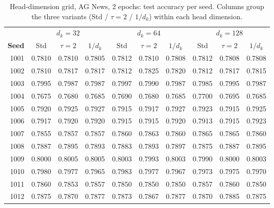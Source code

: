 \documentclass[10pt,a4paper]{article}
\newcommand{\dk}{d_k}
\begin{document}
\begin{table}[H]
  \centering
  \caption{Head-dimension grid, AG News, 2 epochs: test accuracy per seed.
  Columns group the three variants (Std / $\tau{=}2$ / $1/\dk$) within each
  head dimension.}
  \scriptsize
  \setlength{\tabcolsep}{3.4pt}
  \begin{tabular}{r ccc ccc ccc}
    \toprule
    & \multicolumn{3}{c}{$\dk = 32$} & \multicolumn{3}{c}{$\dk = 64$} & \multicolumn{3}{c}{$\dk = 128$} \\
    \cmidrule(lr){2-4}\cmidrule(lr){5-7}\cmidrule(lr){8-10}
    \textbf{Seed} & Std & $\tau{=}2$ & $1/\dk$ & Std & $\tau{=}2$ & $1/\dk$
     & Std & $\tau{=}2$ & $1/\dk$ \\
    \midrule
1001 & 0.7810 & 0.7810 & 0.7805 & 0.7812 & 0.7810 & 0.7808 & 0.7812 & 0.7808 & 0.7808 \\
1002 & 0.7810 & 0.7817 & 0.7817 & 0.7812 & 0.7825 & 0.7820 & 0.7812 & 0.7817 & 0.7815 \\
1003 & 0.7995 & 0.7987 & 0.7987 & 0.7997 & 0.7990 & 0.7987 & 0.7985 & 0.7995 & 0.7987 \\
1004 & 0.7675 & 0.7680 & 0.7685 & 0.7690 & 0.7680 & 0.7685 & 0.7700 & 0.7695 & 0.7685 \\
1005 & 0.7920 & 0.7925 & 0.7927 & 0.7915 & 0.7917 & 0.7927 & 0.7923 & 0.7915 & 0.7925 \\
1006 & 0.7917 & 0.7920 & 0.7920 & 0.7915 & 0.7915 & 0.7920 & 0.7913 & 0.7915 & 0.7923 \\
1007 & 0.7855 & 0.7857 & 0.7857 & 0.7860 & 0.7863 & 0.7860 & 0.7865 & 0.7865 & 0.7860 \\
1008 & 0.7887 & 0.7895 & 0.7893 & 0.7883 & 0.7893 & 0.7897 & 0.7875 & 0.7887 & 0.7895 \\
1009 & 0.8000 & 0.8005 & 0.8005 & 0.8003 & 0.7993 & 0.8003 & 0.7990 & 0.8000 & 0.8003 \\
1010 & 0.7980 & 0.7977 & 0.7965 & 0.7983 & 0.7977 & 0.7967 & 0.7973 & 0.7975 & 0.7970 \\
1011 & 0.7860 & 0.7853 & 0.7857 & 0.7850 & 0.7850 & 0.7850 & 0.7857 & 0.7860 & 0.7850 \\
1012 & 0.7875 & 0.7870 & 0.7877 & 0.7873 & 0.7867 & 0.7877 & 0.7870 & 0.7885 & 0.7875 \\
    \bottomrule
  \end{tabular}
\end{table}
\end{document}
